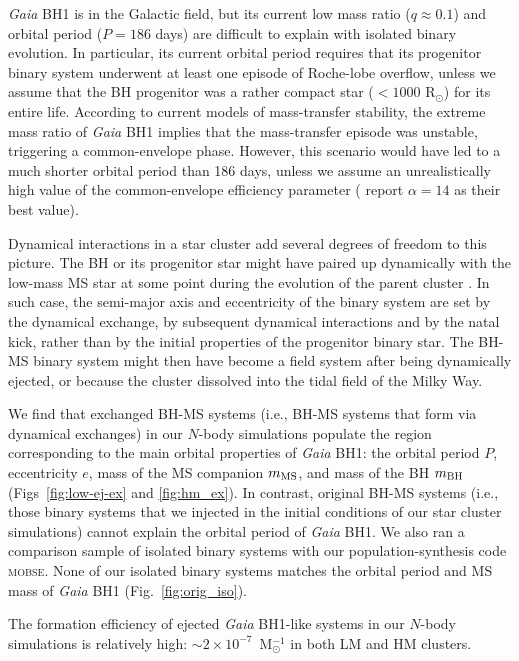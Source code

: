 \documentclass[fleqn,usenatbib]{mnras}
\newcommand{\bh}{\textit{Gaia} BH1}
\begin{document}
\bh{} is in the Galactic field, but its  current low mass ratio ($q\approx{0.1}$) and  orbital period ($P=186$ days) are 
difficult to explain with isolated binary evolution. In particular, its current orbital period requires that its progenitor binary system underwent at least one episode of Roche-lobe overflow, unless we assume that the BH progenitor was a rather compact star ($<1000$ R$_\odot$) for its entire life. According to current models of mass-transfer stability, the extreme mass ratio of \bh{} implies that the mass-transfer episode was unstable, triggering a common-envelope phase. However, this scenario would have led to a much shorter orbital period than 186 days, unless we assume an unrealistically high value of the common-envelope efficiency parameter (\citealt{elbadry2023a} report $\alpha=14$ as their best value).

Dynamical interactions in a star cluster add several degrees of freedom to this picture. The BH or its progenitor star might have paired up dynamically with the low-mass MS star at some point during the evolution of the parent cluster \citep{shikauchi2020,tanikawa2023}. In such case, the semi-major axis and eccentricity of the binary system are set by the dynamical exchange, by subsequent dynamical interactions and by the natal kick, rather than by the initial properties of the progenitor binary star. 
The BH-MS binary system might then have become a field system after being dynamically ejected, or because the cluster dissolved into the tidal field of the Milky Way.


We find that 
exchanged BH-MS systems (i.e., 
BH-MS systems that form via dynamical exchanges) in our $N$-body simulations populate the region corresponding to the main orbital properties of \bh{}: the orbital period $P$, eccentricity $e$, mass of the MS companion $m_{\rm MS}$, and mass of the BH $m_{\rm BH}$ (Figs~\ref{fig:low-ej-ex} and \ref{fig:hm_ex}). In contrast, 
original BH-MS systems 
(i.e., those binary systems that we injected in the initial conditions of our star cluster simulations) cannot explain the orbital period of \bh{}. 
 We also ran a comparison sample of isolated binary systems with our population-synthesis code \textsc{mobse}. None of our isolated binary systems matches the orbital period and MS mass of \bh{} (Fig.~\ref{fig:orig_iso}). 


The formation efficiency of ejected \bh{}-like systems in our $N$-body simulations is relatively high: $\sim{2\times{}10^{-7}}$~M$_\odot^{-1}$ 
in both LM and HM clusters.
\end{document}
